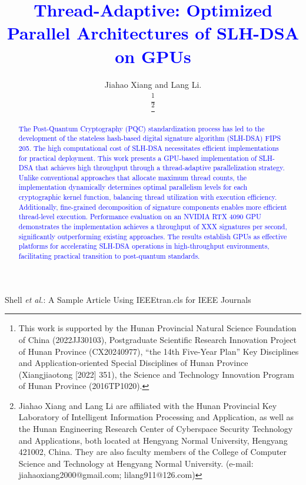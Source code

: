 \documentclass[journal]{IEEEtran}
\begin{document}
\title{\textcolor{blue}{Thread-Adaptive: Optimized Parallel Architectures of SLH-DSA on GPUs}}

\author{Jiahao Xiang and Lang Li.

  \thanks{This work is supported by the Hunan Provincial Natural Science Foundation of China (2022JJ30103), Postgraduate Scientific Research Innovation Project of Hunan Province (CX20240977), “the 14th Five-Year Plan” Key Disciplines and Application-oriented Special Disciplines of Hunan Province (Xiangjiaotong [2022] 351), the Science and Technology Innovation Program of Hunan Province (2016TP1020).}

  \thanks{Jiahao Xiang and Lang Li are affiliated with the Hunan Provincial Key Laboratory of Intelligent Information Processing and Application, as well as the Hunan Engineering Research Center of Cyberspace Security Technology and Applications, both located at Hengyang Normal University, Hengyang 421002, China. They are also faculty members of the College of Computer Science and Technology at Hengyang Normal University. (e-mail: jiahaoxiang2000@gmail.com; lilang911@126.com)}%
}

%
{Shell \MakeLowercase{\textit{et al.}}: A Sample Article Using IEEEtran.cls for IEEE Journals}

\IEEEpubid{}

\maketitle

\begin{abstract}
  \textcolor{blue}{The Post-Quantum Cryptography (PQC) standardization process has led to the development of the stateless hash-based digital signature algorithm (SLH-DSA) FIPS 205. The high computational cost of SLH-DSA necessitates efficient implementations for practical deployment. This work presents a GPU-based implementation of SLH-DSA that achieves high throughput through a thread-adaptive parallelization strategy. Unlike conventional approaches that allocate maximum thread counts, the implementation dynamically determines optimal parallelism levels for each cryptographic kernel function, balancing thread utilization with execution efficiency. Additionally, fine-grained decomposition of signature components enables more efficient thread-level execution. Performance evaluation on an NVIDIA RTX 4090 GPU demonstrates the implementation achieves a throughput of XXX signatures per second, significantly outperforming existing approaches. The results establish GPUs as effective platforms for accelerating SLH-DSA operations in high-throughput environments, facilitating practical transition to post-quantum standards.}
\end{abstract}
\end{document}
